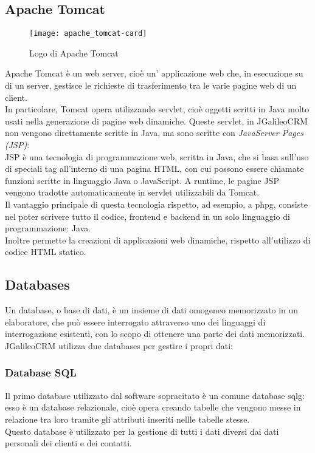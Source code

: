 \subsection{Apache Tomcat}
\begin{figure}[h]
	\centering
	\texttt{[image: apache\_tomcat-card]}
	\caption{Logo di Apache Tomcat}
\end{figure}
Apache Tomcat è un web server, cioè un' applicazione web che, in esecuzione su di un server, gestisce le richieste di trasferimento tra le varie pagine web di un client.\\
In particolare, Tomcat opera utilizzando servlet, cioè oggetti scritti in Java molto usati nella generazione di pagine web dinamiche.
Queste servlet, in JGalileoCRM non vengono direttamente scritte in Java, ma sono scritte con \emph{JavaServer Pages (JSP)}:\\
JSP è una tecnologia di programmazione web, scritta in Java, che si basa sull'uso di speciali tag all'interno di una pagina HTML, con cui possono essere chiamate funzioni scritte in linguaggio Java o JavaScript.
A runtime, le pagine JSP vengono tradotte automaticamente in servlet utilizzabili da Tomcat. \\
Il vantaggio principale di questa tecnologia rispetto, ad esempio, a \gls{phpg}, consiste nel poter scrivere tutto il codice, frontend e backend in un solo linguaggio di programmazione: Java. \\
Inoltre permette la creazioni di applicazioni web dinamiche, rispetto all'utilizzo di codice HTML statico.
\subsection{Databases}
Un database, o base di dati, è un insieme di dati omogeneo memorizzato in un elaboratore, che può essere interrogato attraverso uno dei linguaggi di interrogazione esistenti, con lo scopo di ottenere una parte dei dati memorizzati.
JGalileoCRM utilizza due databases per gestire i propri dati:
\subsubsection{Database SQL}
Il primo database utilizzato dal software sopracitato è un comune database \gls{sqlg}: esso è un database relazionale, cioè opera creando tabelle che vengono messe in relazione tra loro tramite gli attributi inseriti nellle tabelle stesse.\\
Questo database è utilizzato per la gestione di tutti i dati diversi dai dati personali dei clienti e dei contatti. %
